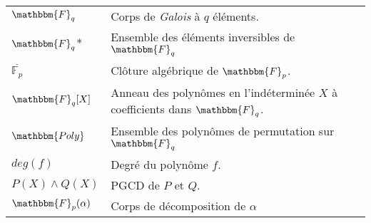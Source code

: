 \documentclass[12pt]{article}
\theoremstyle{remark}\newtheorem{note}{Note}
\theoremstyle{remark}\newtheorem{nota}{Notation}
\theoremstyle{definition}
\begin{document}
\vspace{3cm}
\begin{tabular}{p{4cm}p{15cm}}
$\mathbbm{F}_q$ & Corps de \textit{Galois} à $q$ éléments.\\
$\mathbbm{F}_q$* & Ensemble des éléments inversibles de $\mathbbm{F}_q$\\
$\overline{\mathbb{F}_p}$ & Clôture algébrique de $\mathbbm{F}_p$.\\
$\mathbbm{F}_q[X]$ & Anneau des polynômes en l'indéterminée $X$ à coefficients dans $\mathbbm{F}_q$.\\
$\mathbbm{Poly}$ & Ensemble des polynômes de permutation sur $\mathbbm{F}_q$\\
$deg(f)$ & Degré du polynôme $f$.\\
$P(X) \wedge Q(X)$ & PGCD de $P$ et $Q$.\\
$\mathbbm{F}_p(\alpha)$ & Corps de décomposition de  $\alpha$\\
\end{tabular}

\pagebreak

\end{document}
